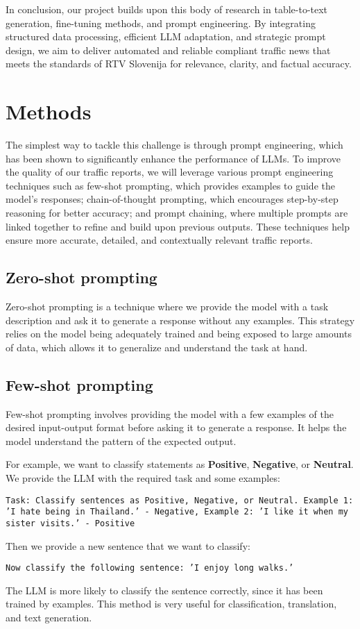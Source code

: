 \documentclass[fleqn,moreauthors,10pt]{ds_report}
\begin{document}
In conclusion, our project builds upon this body of research in table-to-text generation, fine-tuning methods, and prompt engineering. By integrating structured data processing, efficient LLM adaptation, and strategic prompt design, we aim to deliver automated and reliable compliant traffic news that meets the standards of RTV Slovenija for relevance, clarity, and factual accuracy.

\section*{Methods}
The simplest way to tackle this challenge is through prompt engineering, which has been shown to significantly enhance the performance of LLMs.
To improve the quality of our traffic reports, we will leverage various prompt engineering techniques such as few-shot prompting, which provides examples to guide the model’s responses; chain-of-thought prompting, which encourages step-by-step reasoning for better accuracy; and prompt chaining, where multiple prompts are linked together to refine and build upon previous outputs.
These techniques help ensure more accurate, detailed, and contextually relevant traffic reports.

\subsection{Zero-shot prompting}
Zero-shot prompting is a technique where we provide the model with a task description and ask it to generate a response without any examples.
This strategy relies on the model being adequately trained and being exposed to large amounts of data, which allows it to generalize and understand the task at hand.



\subsection*{Few-shot prompting}
Few-shot prompting involves providing the model with a few examples of the desired input-output format before asking it to generate a response.
It helps the model understand the pattern of the expected output.

For example, we want to classify statements as \textbf{Positive}, \textbf{Negative}, or \textbf{Neutral}.
We provide the LLM with the required task and some examples:
\begin{center}
    \texttt{Task: Classify sentences as Positive, Negative, or Neutral.\newline
    Example 1: 'I hate being in Thailand.' - Negative,\newline
    Example 2: 'I like it when my sister visits.' - Positive}
\end{center}
Then we provide a new sentence that we want to classify:
\begin{center}
    \texttt{Now classify the following sentence: 'I enjoy long walks.'}
\end{center}
The LLM is more likely to classify the sentence correctly, since it has been trained by examples.
This method is very useful for classification, translation, and text generation.
\end{document}
